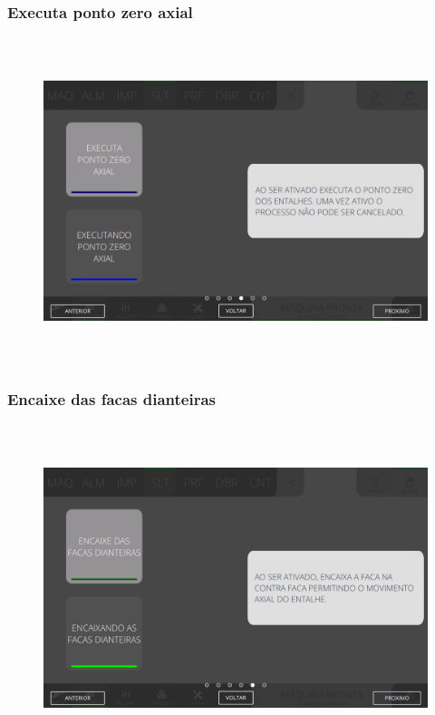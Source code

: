 \newpage
\thispagestyle{fancy}
\vspace*{40 pt}
\subsubsection{\small{Executa ponto zero axial}}\label{telaComandoSlotterExecutaPontoZeroAxial}
\vspace*{\fill}
\begin{figure}[h]
  \centering
  \includegraphics[width=576px,height=360px]{src/imagesMiniline/05-Slotter/Commands/e4.png}
\end{figure}
\vspace*{\fill}

\newpage
\thispagestyle{fancy}
\vspace*{40 pt}
\subsubsection{\small{Encaixe das facas dianteiras}}\label{telaComandoSlotterEncaixeDasFacasDianteiras}
\vspace*{\fill}
\begin{figure}[h]
  \centering
  \includegraphics[width=576px,height=360px]{src/imagesMiniline/05-Slotter/Commands/e5.png}
\end{figure}
\vspace*{\fill}

